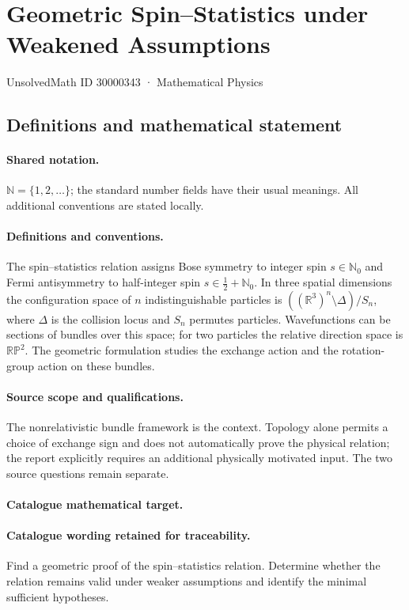 \documentclass[11pt]{article}
\begin{document}
\setcounter{section}{30000342}
\section{Geometric Spin–Statistics under Weakened Assumptions}\label{30000343}
{\small UnsolvedMath ID 30000343 · Mathematical Physics}
\subsection{Definitions and mathematical statement}

\paragraph{Shared notation.}$\mathbb N=\{1,2,\ldots\}$; the standard number fields have their usual meanings. All additional conventions are stated locally.


\paragraph{Definitions and conventions.} The spin--statistics relation assigns Bose symmetry to integer spin $s\in\mathbb N_0$ and Fermi antisymmetry to half-integer spin $s\in\tfrac12+\mathbb N_0$. In three spatial dimensions the configuration space of $n$ indistinguishable particles is $((\mathbb R^3)^n\setminus\Delta)/S_n$, where $\Delta$ is the collision locus and $S_n$ permutes particles. Wavefunctions can be sections of bundles over this space; for two particles the relative direction space is $\mathbb{RP}^2$. The geometric formulation studies the exchange action and the rotation-group action on these bundles.

\paragraph{Source scope and qualifications.} The nonrelativistic bundle framework is the context. Topology alone permits a choice of exchange sign and does not automatically prove the physical relation; the report explicitly requires an additional physically motivated input. The two source questions remain separate.

\paragraph{Catalogue mathematical target.}
\paragraph{Catalogue wording retained for traceability.}
Find a geometric proof of the spin–statistics relation. Determine whether the relation remains valid under weaker assumptions and identify the minimal sufficient hypotheses.
\end{document}
